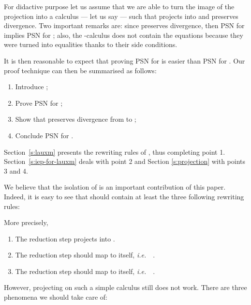 \documentclass{LMCS}
\newcommand{\ie}{{\it  i.e.}~}
\renewcommand{\>}{\rightarrow}
\begin{document}
For didactive purpose let us assume that we are able to turn the image
of the projection into a calculus --- let us say  --- such that
 projects  into  and preserves divergence. Two
important remarks are: since  preserves divergence, then
PSN for  implies PSN for ; also, the -calculus
does not contain the equations  because
they were turned into equalities thanks to their side conditions.


It is then reasonable  to expect that proving PSN for 
 is easier
than PSN for . Our proof technique can then be summarised as follows:
\begin{enumerate}[(1)]
  \item Introduce ;
  \item Prove PSN for ; 
  \item Show that  preserves divergence from  to ;
  \item Conclude PSN for .
\end{enumerate}

Section~\ref{s:lauxm} presents the rewriting rules of
, thus completing point 1. Section~\ref{s:iep-for-lauxm} deals with point
2 and Section \ref{s:projection} with points 3 and 4.\medskip

We believe that the isolation of  is an important contribution
of this paper. Indeed, it is easy to
see that  should contain at least the three following rewriting rules:

 

More precisely, 

\begin{enumerate}[]
  \item The reduction step  projects into . 
\item The reduction step  should map to itself, \ie\ . 
\item The reduction step  
 should map to itself, \ie\
.
\end{enumerate}
However,  projecting on
such a simple calculus still does not work. There are 
three  phenomena  we should
take care of:
\end{document}
